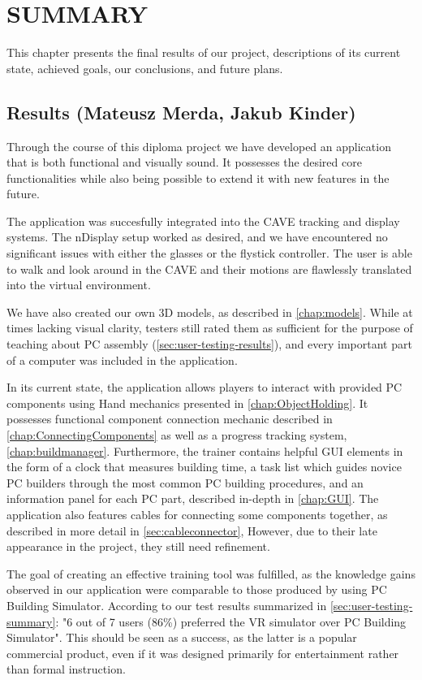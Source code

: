 \chapter{SUMMARY} 
This chapter presents the final results of our project, descriptions of its current state, achieved goals, our conclusions, and future plans.

\section{Results (Mateusz Merda, Jakub Kinder)}
\label{sec:results}
Through the course of this diploma project we have developed an application that is both functional and visually sound. It possesses the desired core functionalities while also being possible to extend it with new features in the future.

The application was succesfully integrated into the CAVE tracking and display systems. The nDisplay setup worked as desired, and we have encountered no significant issues with either the glasses or the flystick controller. The user is able to walk and look around in the CAVE and their motions are flawlessly translated into the virtual environment.

We have also created our own 3D models, as described in \autoref{chap:models}. While at times lacking visual clarity, testers still rated them as sufficient for the purpose of teaching about PC assembly (\autoref{sec:user-testing-results}), and every important part of a computer was included in the application.

In its current state, the application allows players to interact with provided PC components using Hand mechanics presented in \autoref{chap:ObjectHolding}. It possesses functional component connection mechanic described in \autoref{chap:ConnectingComponents} as well as a progress tracking system, \autoref{chap:buildmanager}.
Furthermore, the trainer contains helpful GUI elements in the form of a clock that measures building time, a task list which guides novice PC builders through the most common PC building procedures, and an information panel for each PC part, described in-depth in \autoref{chap:GUI}.
The application also features cables for connecting some components together, as described in more detail in \autoref{sec:cableconnector}, However, due to their late appearance in the project, they still need refinement.

The goal of creating an effective training tool was fulfilled, as the knowledge gains observed in our application were comparable to those produced by using PC Building Simulator. According to our test results summarized in \autoref{sec:user-testing-summary}: "6 out of 7 users (86\%) preferred the VR simulator over PC Building Simulator". This should be seen as a success, as the latter is a popular commercial product, even if it was designed primarily for entertainment rather than formal instruction.

